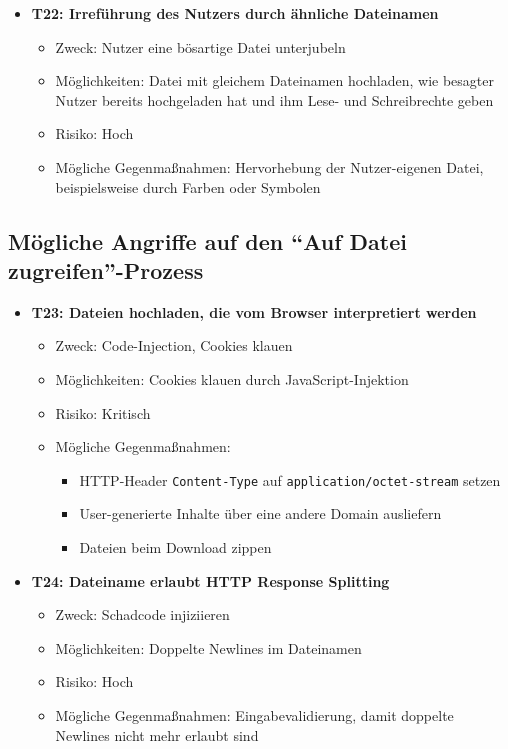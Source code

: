\documentclass[12pt,DIV14,BCOR10mm,a4paper,parskip=half-,headsepline,headinclude,english,ngerman,bibliography=totocnumbered]{scrreprt}
\begin{document}
\begin{itemize}
  \hypertarget{threat22}{}
  \item \textbf{T22: Irreführung des Nutzers durch ähnliche Dateinamen}
  \begin{itemize}
  \item Zweck: Nutzer eine bösartige Datei unterjubeln
  \item Möglichkeiten: Datei mit gleichem Dateinamen hochladen, wie besagter Nutzer bereits hochgeladen hat und ihm Lese- und Schreibrechte geben
  \item Risiko: Hoch
  \item Mögliche Gegenmaßnahmen: Hervorhebung der Nutzer-eigenen Datei, beispielsweise durch Farben oder Symbolen
  \end{itemize}
\end{itemize}

\subsection{Mögliche Angriffe auf den \enquote{Auf Datei zugreifen}-Prozess}

\begin{itemize}
  \hypertarget{threat23}{}
  \item \textbf{T23: Dateien hochladen, die vom Browser interpretiert werden}
  \begin{itemize}
  \item Zweck: Code-Injection, Cookies klauen
  \item Möglichkeiten: Cookies klauen durch JavaScript-Injektion
  \item Risiko: Kritisch
  \item Mögliche Gegenmaßnahmen:
    \begin{itemize}
      \item HTTP-Header \texttt{Content-Type} auf \texttt{application/octet-stream} setzen
      \item User-generierte Inhalte über eine andere Domain ausliefern
      \item Dateien beim Download zippen
    \end{itemize}
  \end{itemize}

  \hypertarget{threat24}{}
  \item \textbf{T24: Dateiname erlaubt HTTP Response Splitting}
  \begin{itemize}
  \item Zweck: Schadcode injiziieren
  \item Möglichkeiten: Doppelte Newlines im Dateinamen
  \item Risiko: Hoch
  \item Mögliche Gegenmaßnahmen: Eingabevalidierung, damit doppelte Newlines nicht mehr erlaubt sind
  \end{itemize}
\end{itemize}
\end{document}
